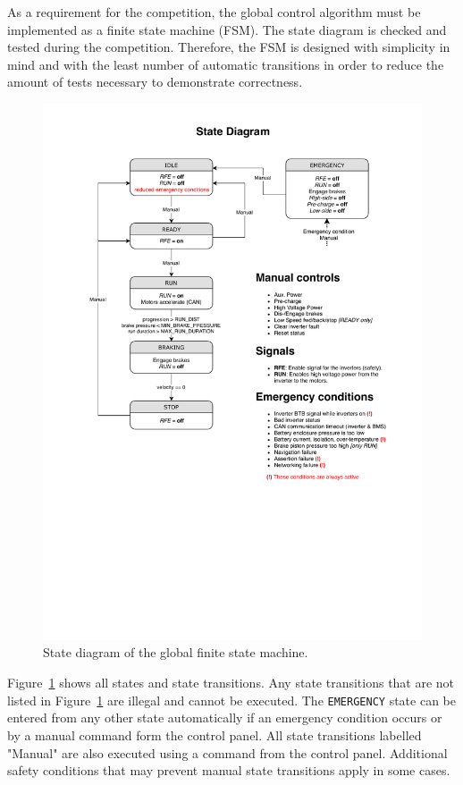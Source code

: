 As a requirement for the competition, the global control algorithm must be implemented as a finite state machine (FSM). The state diagram is checked and tested during the competition. Therefore, the FSM is designed with simplicity in mind and with the least number of automatic transitions in order to reduce the amount of tests necessary to demonstrate correctness.

\begin{figure}[H]
    \centering \includegraphics[width=1.0\textwidth]{./figures/state_diagram.pdf}
    \caption{State diagram of the global finite state machine.}
    \label{fig:state_diagram}
\end{figure}

Figure~\ref{fig:state_diagram} shows all states and state transitions. Any state transitions that are not listed in Figure~\ref{fig:state_diagram} are illegal and cannot be executed. The \texttt{EMERGENCY} state can be entered from any other state automatically if an emergency condition occurs or by a manual command form the control panel. All state transitions labelled "Manual" are also executed using a command from the control panel. Additional safety conditions that may prevent manual state transitions apply in some cases.

